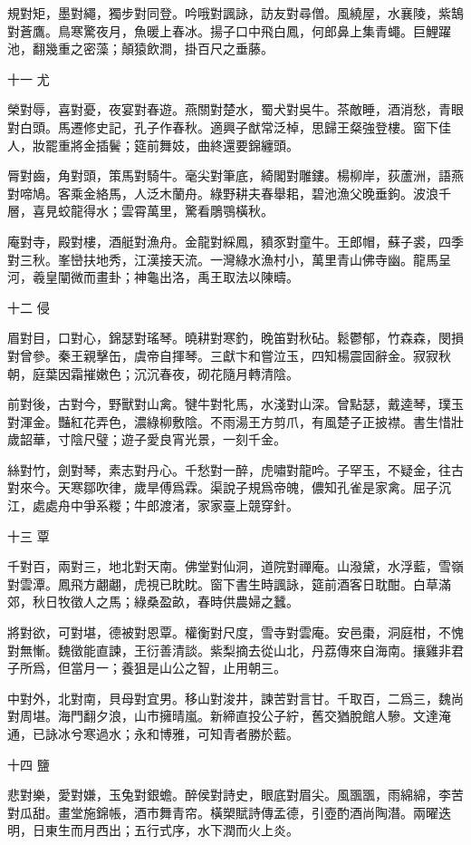 \documentclass[12pt,a4paper]{ctexbook}
\begin{document}
規對矩，墨對繩，獨步對同登。吟哦對諷詠，訪友對尋僧。風繞屋，水襄陵，紫鵠對蒼鷹。鳥寒驚夜月，魚暖上春冰。揚子口中飛白鳳，何郎鼻上集青蠅。巨鯉躍池，翻幾重之密藻；顛猿飲澗，掛百尺之垂藤。\par
十一 尤\par
榮對辱，喜對憂，夜宴對春遊。燕關對楚水，蜀犬對吳牛。茶敵睡，酒消愁，青眼對白頭。馬遷修史記，孔子作春秋。適興子猷常泛棹，思歸王粲強登樓。窗下佳人，妝罷重將金插鬢；筵前舞妓，曲終還要錦纏頭。\par
脣對齒，角對頭，策馬對騎牛。毫尖對筆底，綺閣對雕鏤。楊柳岸，荻蘆洲，語燕對啼鳩。客乘金絡馬，人泛木蘭舟。綠野耕夫春舉耜，碧池漁父晚垂鉤。波浪千層，喜見蛟龍得水；雲霄萬里，驚看鵰鶚橫秋。\par
庵對寺，殿對樓，酒艇對漁舟。金龍對綵鳳，豶豕對童牛。王郎帽，蘇子裘，四季對三秋。峯巒扶地秀，江漢接天流。一灣綠水漁村小，萬里青山佛寺幽。龍馬呈河，羲皇闡微而畫卦；神龜出洛，禹王取法以陳疇。\par
十二 侵\par
眉對目，口對心，錦瑟對瑤琴。曉耕對寒釣，晚笛對秋砧。鬆鬱郁，竹森森，閔損對曾參。秦王親擊缶，虞帝自揮琴。三獻卞和嘗泣玉，四知楊震固辭金。寂寂秋朝，庭葉因霜摧嫩色；沉沉春夜，砌花隨月轉清陰。\par
前對後，古對今，野獸對山禽。犍牛對牝馬，水淺對山深。曾點瑟，戴逵琴，璞玉對渾金。豔紅花弄色，濃綠柳敷陰。不雨湯王方剪爪，有風楚子正披襟。書生惜壯歲韶華，寸陰尺璧；遊子愛良宵光景，一刻千金。\par
絲對竹，劍對琴，素志對丹心。千愁對一醉，虎嘯對龍吟。子罕玉，不疑金，往古對來今。天寒鄒吹律，歲旱傅爲霖。渠說子規爲帝魄，儂知孔雀是家禽。屈子沉江，處處舟中爭系糉；牛郎渡渚，家家臺上競穿針。\par
十三 覃\par
千對百，兩對三，地北對天南。佛堂對仙洞，道院對禪庵。山潑黛，水浮藍，雪嶺對雲潭。鳳飛方翽翽，虎視已眈眈。窗下書生時諷詠，筵前酒客日耽酣。白草滿郊，秋日牧徵人之馬；綠桑盈畝，春時供農婦之蠶。\par
將對欲，可對堪，德被對恩覃。權衡對尺度，雪寺對雲庵。安邑棗，洞庭柑，不愧對無慚。魏徵能直諫，王衍善清談。紫梨摘去從山北，丹荔傳來自海南。攘雞非君子所爲，但當月一；養狙是山公之智，止用朝三。\par
中對外，北對南，貝母對宜男。移山對浚井，諫苦對言甘。千取百，二爲三，魏尚對周堪。海門翻夕浪，山市擁晴嵐。新締直投公子紵，舊交猶脫館人驂。文達淹通，已詠冰兮寒過水；永和博雅，可知青者勝於藍。\par
十四 鹽\par
悲對樂，愛對嫌，玉兔對銀蟾。醉侯對詩史，眼底對眉尖。風飁飁，雨綿綿，李苦對瓜甜。畫堂施錦帳，酒市舞青帘。橫槊賦詩傳孟德，引壺酌酒尚陶潛。兩曜迭明，日東生而月西出；五行式序，水下潤而火上炎。\par
\end{document}
